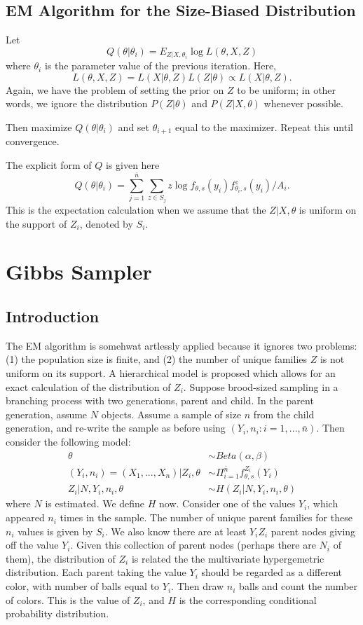 \documentclass[11 pt]{article}
\renewcommand{\th}{\theta}
\newcommand{\fths}{f_{\th,s}}
\begin{document}
\subsection{EM Algorithm for the Size-Biased Distribution}

Let
\[
Q(\th | \th_i) = E_{Z|X,\th_i} \log L(\th,X,Z)
\]
where $\th_i$ is the parameter value of the previous iteration. Here,
\[
L(\th,X,Z) = L(X | \th, Z) L(Z | \th) \propto L(X | \th, Z).
\] 
Again, we have the problem of setting the prior on $Z$ to be uniform; in other words, we ignore the distribution $P(Z | \th)$ and $P(Z | X, \th)$ whenever possible.


Then maximize $Q(\th|\th_i)$ and set $\th_{i+1}$ equal to the maximizer. Repeat this until convergence.

The explicit form of $Q$ is given here
\[
Q(\th | \th_i) = \sum_{j=1}^{\bar{n}} \sum_{z \in S_j} z \log \fths (y_i) f^z_{\th_i,s}(y_i) / A_i.
\]
This is the expectation calculation when we assume that the $Z | X, \th$ is uniform on the support of $Z_i$, denoted by $S_i$.


\section{Gibbs Sampler}

\subsection{Introduction}

The EM algorithm is somehwat artlessly applied because it ignores two problems: (1) the population size is finite, and (2) the number of unique families $Z$ is not uniform on its support. A hierarchical model is proposed which allows for an exact calculation of the distribution of $Z_i$. Suppose brood-sized sampling in a branching process with two generations, parent and child. In the parent generation, assume $N$ objects. Assume a sample of size $n$ from the child generation, and re-write the sample as before using $(Y_i,n_i : i=1,...,\bar{n})$. Then consider the following model:
\begin{align*}
\th &\sim Beta(\alpha, \beta) \\
(Y_i, n_i) = (X_1,...,X_n) | Z_i, \th &\sim \Pi_{i=1}^{\bar{n}} \fths^{Z_i}(Y_i) \\
Z_i | N, Y_i, n_i, \th &\sim H(Z_i | N, Y_i, n_i, \th)
\end{align*}
where $N$ is estimated. We define $H$ now. Consider one of the values $Y_i$, which appeared $n_i$ times in the sample. The number of unique parent families for these $n_i$ values is given by $S_i$. We also know there are at least $Y_i  Z_i$ parent nodes giving off the value $Y_i$. Given this collection of parent nodes (perhaps there are $N_i$ of them), the distribution of $Z_i$ is related the the multivariate hypergemetric distribution. Each parent taking the value $Y_i$ should be regarded as a different color, with number of balls equal to $Y_i$. Then draw $n_i$ balls and count the number of colors. This is the value of $Z_i$, and $H$ is the corresponding conditional probability distribution. 
\end{document}
